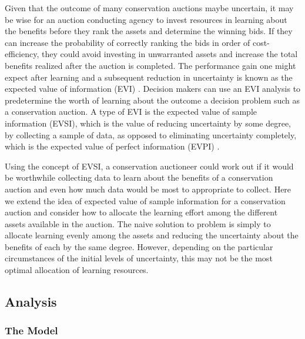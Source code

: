 \documentclass[]{article}
\theoremstyle{definition}
\theoremstyle{definition}
\theoremstyle{remark}
\begin{document}
Given that the outcome of many conservation auctions maybe uncertain, it
may be wise for an auction conducting agency to invest resources in
learning about the benefits before they rank the assets and determine
the winning bids. If they can increase the probability of correctly
ranking the bids in order of cost-efficiency, they could avoid investing
in unwarranted assets and increase the total benefits realized after the
auction is completed. The performance gain one might expect after
learning and a subsequent reduction in uncertainty is known as the
expected value of information (EVI) \citep{Raiffa1961}. Decision makers
can use an EVI analysis to predetermine the worth of learning about the
outcome a decision problem such as a conservation auction. A type of EVI
is the expected value of sample information (EVSI), which is the value
of reducing uncertainty by some degree, by collecting a sample of data,
as opposed to eliminating uncertainty completely, which is the expected
value of perfect information (EVPI) \citep{Yokota2004b}.

Using the concept of EVSI, a conservation auctioneer could work out if
it would be worthwhile collecting data to learn about the benefits of a
conservation auction and even how much data would be most to appropriate
to collect. Here we extend the idea of expected value of sample
information for a conservation auction and consider how to allocate the
learning effort among the different assets available in the auction. The
naive solution to problem is simply to allocate learning evenly among
the assets and reducing the uncertainty about the benefits of each by
the same degree. However, depending on the particular circumstances of
the initial levels of uncertainty, this may not be the most optimal
allocation of learning resources.

\subsection*{Analysis}\label{analysis}

\subsubsection*{The Model}\label{the-model}
\end{document}
